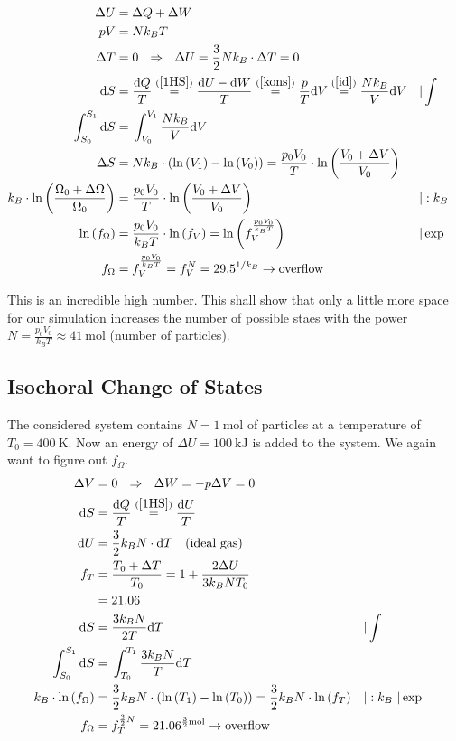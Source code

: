 \documentclass[11pt,a4paper]{scrartcl}
\newcommand{\dd}{\text{d}} 							%
\newcommand{\D}{\Delta} 								%
\newcommand{\Ln}[1]{\text{ln}\left( #1 \right)}			%
\newcommand{\eref}[1]{(\ref{#1})}						%
\begin{document}
\begin{align}
\D U 
	=&\; \D Q + \D W
	\label{1HS}\\
pV 
	=&\; Nk_BT
	\label{id}\\
\D T 
	=&\; 0 
	\ \ \Rightarrow \ \ \D U 
	= \frac{3}{2}Nk_B\cdot \D T
	= 0
	\label{kons}\\
\dd S 
	=&\; \frac{\dd Q}{T} 
	\stackrel{\eref{1HS}}{=} \frac{\dd U-\dd W}{T} 
	\stackrel{\eref{kons}}{=} \frac{p}{T}\dd V 
	\stackrel{\eref{id}}{=} \frac{Nk_B}{V}\dd V 
	&&|\int
	\label{dS}\\
\int_{S_0}^{S_1} \dd S
	=&\; \int_{V_0}^{V_1}\frac{Nk_B}{V}\dd V
	\label{sint}\\
\D S 
	=&\; Nk_B\cdot\left(\Ln{V_1}-\Ln{V_0}\right) 
	=\frac{p_0V_0}{T}\cdot\Ln{\frac{V_0+\D V}{V_0}}
	\label{DS}\\
k_B\cdot \Ln{\frac{\Omega_0+\D \Omega}{\Omega_0}} 
	=&\;\frac{p_0V_0}{T}\cdot\Ln{\frac{V_0+\D V}{V_0}} 
	&&|:k_B
	\label{SO}\\
\Ln{f_\Omega} 
	=&\; \frac{p_0V_0}{k_BT}\cdot\Ln{f_V} 
	=\Ln{f_V^{\frac{p_0V_0}{k_BT}}} 
	&&|\exp
	\label{lnO}\\
f_\Omega 
	=&\; f_V^{\frac{p_0V_0}{k_BT}} 
	= f_V^N 
	= 29.5^{1/k_B} 
	\rightarrow \text{overflow}
	\label{Omega}
\end{align}

This is an incredible high number. 
This shall show that only a little more space for our simulation increases the number of possible staes with the power $N = \frac{p_0V_0}{k_BT}\approx\SI{41}{\mole}$ (number of particles). 

\subsection{Isochoral Change of States}

The considered system contains $N=\SI{1}{\mole}$ of particles at a temperature of $T_0=\SI{400}{\kelvin}$. Now an energy of $\D U =\SI{100}{\kilo\joule}$ is added to the system. We again want to figure out $f_\Omega$.
\begin{align}
\D V 
	=&\; 0
	\ \ \Rightarrow \ \ \D W 
	= -p \D V
	= 0
	\label{kons2}\\
\dd S
	=&\; \frac{\dd Q}{T}
	\stackrel{\eref{1HS}}{=} \frac{\dd U}{T}
	\label{dS2}\\
\dd U 
	=&\; \frac{3}{2}k_BN\cdot\dd T
	\ \ \ \text{(ideal gas)}
	\label{idU}\\
f_T 
	=&\; \frac{T_0+\D T}{T_0} 
	=1+\frac{2\D U}{3k_BNT_0}
	\label{fT1}\\
=&\; 21.06
	\label{fT2}\\
\dd S
	=&\; \frac{3k_BN}{2T}\dd T
	&&|\int
	\label{dSdT}\\
\int_{S_0}^{S_1} \dd S
	=&\; \int_{T_0}^{T_1}\frac{3k_BN}{T}\dd T
	\label{sint2}\\
k_B\cdot\Ln{f_\Omega}
	=&\; \frac{3}{2}k_BN\cdot\left(\Ln{T_1}-\Ln{T_0}\right) 
	= \frac{3}{2}k_BN\cdot\Ln{f_T}
	&&|:k_B\ |\exp
	\label{DO2}\\
f_\Omega 
	=&\; f_T^{\frac{3}{2}N}
	=21.06^{\frac{3}{2}\SI{}{\mole}}
	\rightarrow \text{overflow}
	\label{fO2}
\end{align}
\end{document}
